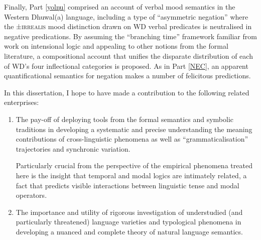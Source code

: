 \documentclass[12pt,dvipsnames]{report}
\begin{document}
Finally, Part \ref{yolŋu} comprised an account of verbal mood semantics in the Western Dhuwal(a) language, including a type of ``asymmetric negation'' where the ±\textsc{irrealis} mood distinction drawn on WD verbal predicates is neutralised in negative predications. By assuming the ``branching time'' framework familiar from work on intensional logic and appealing to other notions from the formal literature, a compositional account that unifies the disparate distribution of each of WD's four inflectional categories is proposed. As in Part \ref{NEC}, an apparent quantificational semantics for negation makes a number of felicitous predictions.


In this dissertation, I hope to have made a contribution to the following related enterprises:
\begin{enumerate}[\bf\it 1 ]
	\item The pay-off of deploying tools from the formal semantics and symbolic traditions in developing a systematic and precise understanding the meaning contributions of cross-linguistic phenomena as well as ``grammaticalisation'' trajectories and synchronic variation.
	
	Particularly crucial from the perspective of the empirical phenomena treated here is the insight that temporal and modal logics are intimately related, a fact that predicts visible interactions between linguistic tense and modal operators.
	\item The importance and utility of rigorous investigation of understudied (and particularly threatened) language varieties and typological phenomena in developing a nuanced and complete theory of natural language semantics.
\end{enumerate}
%


\vfill
\end{document}
